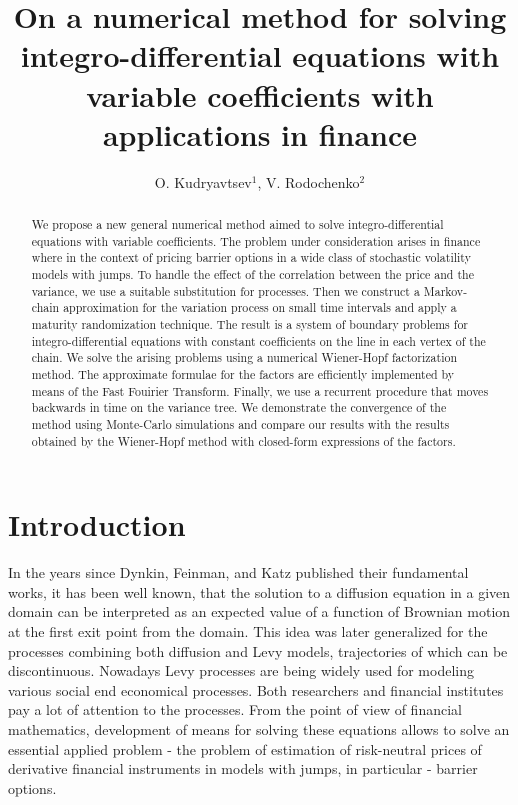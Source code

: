 \documentclass[a4paper]{jpconf}
\begin{document}
\title{On a numerical method for solving integro-differential equations with variable coefficients with applications in finance}

\author{O. Kudryavtsev$^1$, V. Rodochenko$^2$}

\address{$^1$ Russian Customs Academy Rostov branch, Budennovskiy 20, Rostov-on-Don 344002, Russia}
\address{$^2$Institute for Mathematics, Mechanics, and Computer Science in the name of I.I. Vorovich (Southern Federal University), Milchakova str. 8a, Rostov-on-Don 344090, Russia}


\begin{abstract}
	We propose a new general numerical method aimed to solve integro-differential equations with variable coefficients. The problem under consideration arises in finance where in the context of pricing barrier options  in a wide class of stochastic volatility models with jumps. 
	To handle the effect of the correlation between the price and the variance, we use a suitable substitution for processes. Then we construct a Markov-chain approximation for the variation process on small time intervals and apply a maturity randomization technique. The result is a
	system of
	boundary problems for integro-differential equations with constant coefficients on the line in each vertex of the chain. We solve the arising problems  using a numerical  Wiener-Hopf factorization method. The approximate formulae for the factors are efficiently implemented by means of the Fast Fouirier Transform. Finally, we use a recurrent procedure that moves backwards in time on the variance tree. We demonstrate the convergence of the method using Monte-Carlo simulations and compare our results with the
	results obtained by the Wiener-Hopf method with closed-form expressions of the factors.
\end{abstract}

\section{Introduction}

In the years since Dynkin, Feinman, and Katz published their fundamental works, it has been well known, that the solution to a diffusion equation in a given domain can be interpreted as an expected value of a function of Brownian motion at the first exit point from the domain. This idea was later generalized for the processes combining both diffusion and Levy models, trajectories of which can be discontinuous. Nowadays Levy processes are being widely used for modeling various social end economical processes. Both researchers and financial institutes pay a lot of attention to the processes. From the point of view of financial mathematics, development of means for solving these equations allows to solve an essential applied problem - the problem of estimation of risk-neutral prices of derivative financial instruments in models with jumps, in particular - barrier options.
\end{document}
